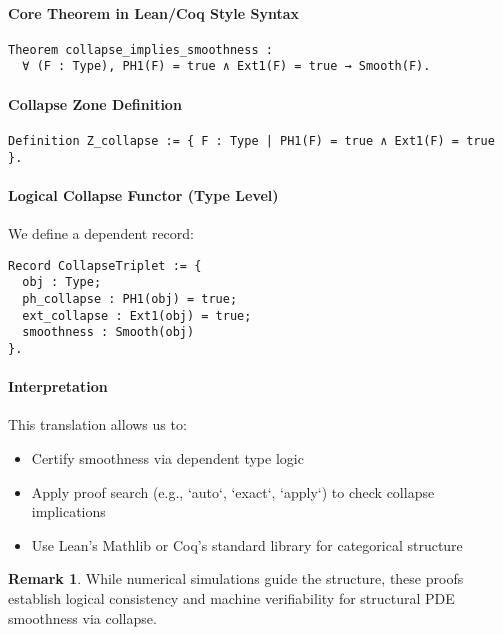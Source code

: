 \documentclass[11pt]{article}
\theoremstyle{definition}
\newtheorem{remark}[theorem]{Remark}
\begin{document}
\paragraph{Core Theorem in Lean/Coq Style Syntax}

\begin{verbatim}
Theorem collapse_implies_smoothness :
  ∀ (F : Type), PH1(F) = true ∧ Ext1(F) = true → Smooth(F).
\end{verbatim}

\paragraph{Collapse Zone Definition}

\begin{verbatim}
Definition Z_collapse := { F : Type | PH1(F) = true ∧ Ext1(F) = true }.
\end{verbatim}

\paragraph{Logical Collapse Functor (Type Level)}

We define a dependent record:

\begin{verbatim}
Record CollapseTriplet := {
  obj : Type;
  ph_collapse : PH1(obj) = true;
  ext_collapse : Ext1(obj) = true;
  smoothness : Smooth(obj)
}.
\end{verbatim}

\paragraph{Interpretation}

This translation allows us to:

\begin{itemize}
  \item Certify smoothness via dependent type logic
  \item Apply proof search (e.g., `auto`, `exact`, `apply`) to check collapse implications
  \item Use Lean’s Mathlib or Coq’s standard library for categorical structure
\end{itemize}

\begin{remark}
While numerical simulations guide the structure, these proofs establish logical consistency and machine verifiability for structural PDE smoothness via collapse.
\end{remark}
\end{document}
